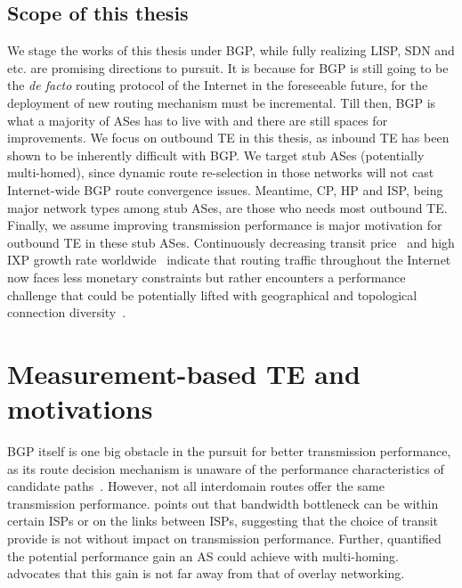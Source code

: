\subsection{Scope of this thesis}
We stage the works of this thesis under BGP, while fully realizing \ac{LISP}, \ac{SDN} and etc. are promising directions to pursuit.
It is because for BGP is still going to be the \textit{de facto} routing protocol of the Internet in the foreseeable future, for the deployment of new routing mechanism must be incremental.
Till then,  BGP is what a majority of ASes has to live with and there are still spaces for improvements.
We focus on outbound TE in this thesis, as inbound TE has been shown to be inherently difficult with BGP.
We target stub ASes (potentially multi-homed), since dynamic route re-selection in those networks will not cast Internet-wide BGP route convergence issues.
Meantime, \acf{CP}, \acf{HP} and \acf{ISP}, being major network types among stub ASes, are those who needs most outbound TE.
Finally, we assume improving transmission performance is major motivation for outbound TE in these stub ASes.
Continuously decreasing transit price~\cite{transitprice, drpeering} and high \ac{IXP} growth rate worldwide~\cite{pchixp} indicate that routing traffic throughout the Internet now faces less monetary constraints but rather encounters a performance challenge that could be potentially lifted with geographical and topological connection diversity~\cite{Chiu2015}.

\section{Measurement-based TE and motivations}

BGP itself is one big obstacle in the pursuit for better transmission performance, as its route decision mechanism is unaware of the performance characteristics of candidate paths~\cite{Yannuzzi2005}.
However, not all interdomain routes offer the same transmission performance. \cite{Akella2003} points out that bandwidth bottleneck can be within certain \acp{ISP} or on the links between \acp{ISP}, suggesting that the choice of transit provide is not without impact on transmission performance.
Further, \cite{Akella2003a} quantified the potential performance gain an AS could achieve with multi-homing.
\cite{Akella2004} advocates that this gain is not far away from that of overlay networking.

